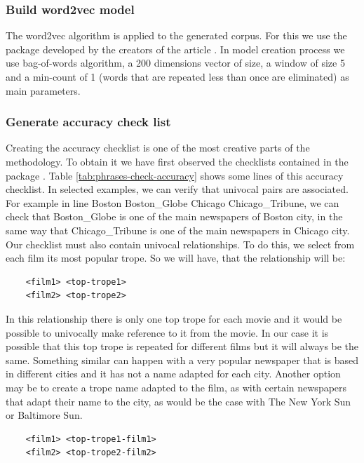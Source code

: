 \documentclass[letterpaper]{article}
\begin{document}
	\subsubsection{Build word2vec model}
	
	The word2vec algorithm is applied to the generated corpus. For this we use the package \cite{git-hub-word2vec} developed by the creators of the article \cite{mikolov2013}. In model creation process we use bag-of-words algorithm, a 200 dimensions vector of size, a window of size 5 and a min-count of 1 (words that are repeated less than once are eliminated) as main parameters.
	
	
	
	\subsubsection{Generate accuracy check list}
	Creating the accuracy checklist is one of the most creative parts of the methodology. To obtain it we have first observed the checklists contained in the package \cite{git-hub-word2vec}. Table \ref{tab:phrases-check-accuracy} shows some lines of this accuracy checklist. 
	In selected examples, we can verify that univocal pairs are associated. For example in line	Boston Boston\_Globe Chicago Chicago\_Tribune, we can check that 
	Boston\_Globe is one of the main newspapers of Boston city, in the same way that Chicago\_Tribune is one of the main newspapers in Chicago city. Our checklist must also contain univocal relationships. To do this, we select from each film its most popular trope. So we will have, that the relationship will be:
	
	\begin{verbatim}
	<film1> <top-trope1> 
	<film2> <top-trope2>
	\end{verbatim}
	
	In this relationship there is only one top trope for each movie and it would be possible to univocally make reference to it from the movie. In our case it is possible that this top trope is repeated for different films but it will always be the same. Something similar can happen with a very popular newspaper that is based in different cities and it has not a name adapted for each city. Another option may be to create a trope name adapted to the film, as with certain newspapers that adapt their name to the city, as would be the case with The New York Sun or Baltimore Sun. 
	\begin{verbatim}
	<film1> <top-trope1-film1> 
	<film2> <top-trope2-film2>
	\end{verbatim}
	
\end{document}
